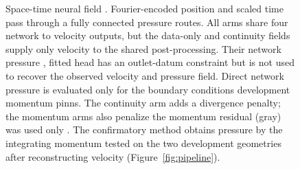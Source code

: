 \documentclass[12pt,a4paper]{article}
\newcommand{\PINNs}{\acp{pinn}\xspace}
\theoremstyle{definition}
\numberwithin{equation}{section}
\providecommand{\DIFaddtex}[1]{{\protect\color{blue} \sf #1}} %
\providecommand{\DIFdeltex}[1]{{\protect\color{red} \scriptsize #1}} %
\providecommand{\DIFaddFL}[1]{\DIFadd{#1}} %
\providecommand{\DIFdelFL}[1]{\DIFdel{#1}} %
\providecommand{\DIFaddbeginFL}{} %
\providecommand{\DIFaddendFL}{} %
\providecommand{\DIFdelbeginFL}{} %
\providecommand{\DIFdelendFL}{} %
\providecommand{\DIFadd}[1]{\texorpdfstring{\DIFaddtex{#1}}{#1}} %
\providecommand{\DIFdel}[1]{\texorpdfstring{\DIFdeltex{#1}}{}} %
\newcommand{\DIFscaledelfig}{0.5}
\newlength{\DIFdelgraphicswidth} %
\newlength{\DIFdelgraphicsheight} %
\newcommand{\DIFaddincludegraphics}[2][]{{\color{blue}\fbox{\DIFOincludegraphics[#1]{#2}}}} %
\newcommand{\DIFdelincludegraphics}[2][]{%
\sbox{\DIFdelgraphicsbox}{\DIFOincludegraphics[#1]{#2}}%
\settoboxwidth{\DIFdelgraphicswidth}{\DIFdelgraphicsbox} %
\settoboxtotalheight{\DIFdelgraphicsheight}{\DIFdelgraphicsbox} %
\scalebox{\DIFscaledelfig}{%
\parbox[b]{\DIFdelgraphicswidth}{\usebox{\DIFdelgraphicsbox}\\[-\baselineskip] \rule{\DIFdelgraphicswidth}{0em}}\llap{\resizebox{\DIFdelgraphicswidth}{\DIFdelgraphicsheight}{%
\setlength{\unitlength}{\DIFdelgraphicswidth}%
\begin{picture}(1,1)%
\thicklines\linethickness{2pt} %
{\color[rgb]{1,0,0}\put(0,0){\framebox(1,1){}}}%
{\color[rgb]{1,0,0}\put(0,0){\line( 1,1){1}}}%
{\color[rgb]{1,0,0}\put(0,1){\line(1,-1){1}}}%
\end{picture}%
}\hspace*{3pt}}} %
} %
\DeclareRobustCommand{\DIFaddbeginFL}{\DIFOaddbeginFL \let\includegraphics\DIFaddincludegraphics} %
\DeclareRobustCommand{\DIFaddendFL}{\DIFOaddendFL \let\includegraphics\DIFOincludegraphics} %
\DeclareRobustCommand{\DIFdelbeginFL}{\DIFOdelbeginFL \let\includegraphics\DIFdelincludegraphics} %
\DeclareRobustCommand{\DIFdelendFL}{\DIFOaddendFL \let\includegraphics\DIFOincludegraphics} %
\begin{document}
\begin{figure}[!t]
{%
  }
  \DIFaddendFL \caption{Space-time neural field \DIFdelbeginFL \DIFdelFL{. Fourier-encoded position }\DIFdelendFL and \DIFdelbeginFL \DIFdelFL{scaled time pass through a fully connected }\DIFdelendFL \DIFaddbeginFL \DIFaddFL{pressure routes. All arms share four }\DIFaddendFL network \DIFdelbeginFL \DIFdelFL{to velocity }\DIFdelendFL \DIFaddbeginFL \DIFaddFL{outputs, but the data-only }\DIFaddendFL and \DIFaddbeginFL \DIFaddFL{continuity fields supply only velocity to the shared post-processing. Their network }\DIFaddendFL pressure \DIFdelbeginFL \DIFdelFL{, fitted }\DIFdelendFL \DIFaddbeginFL \DIFaddFL{head has an outlet-datum constraint but is not used }\DIFaddendFL to \DIFaddbeginFL \DIFaddFL{recover }\DIFaddendFL the \DIFdelbeginFL \DIFdelFL{observed velocity and }\DIFdelendFL \DIFaddbeginFL \DIFaddFL{pressure field. Direct network pressure is evaluated only for }\DIFaddendFL the \DIFdelbeginFL \DIFdelFL{boundary conditions}\DIFdelendFL \DIFaddbeginFL \DIFaddFL{development momentum }\PINNs\DIFaddendFL . The continuity arm adds a divergence penalty; the momentum \DIFaddbeginFL \DIFaddFL{arms also penalize the momentum }\DIFaddendFL residual\DIFdelbeginFL \DIFdelFL{(gray) was used only }\DIFdelendFL \DIFaddbeginFL \DIFaddFL{. The confirmatory method obtains pressure }\DIFaddendFL by \DIFdelbeginFL \DIFdelFL{the }\DIFdelendFL \DIFaddbeginFL \DIFaddFL{integrating }\DIFaddendFL momentum \DIFdelbeginFL %
\DIFdelFL{tested on the two development geometries}\DIFdelendFL \DIFaddbeginFL \DIFaddFL{after reconstructing velocity (Figure~\ref{fig:pipeline})}\DIFaddendFL .}
  \label{fig:network}
\end{figure}
\end{document}
